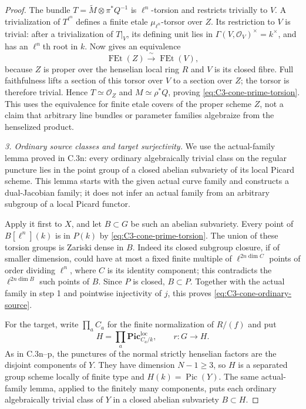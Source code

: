 \begin{proof}
The bundle
$T=\widetilde M\otimes\pi^*Q^{-1}$ is
$\ell^n$-torsion and restricts trivially to
$V$. A trivialization of $T^{\ell^n}$ defines
a finite etale $\mu_{\ell^n}$-torsor over $Z$.
Its restriction to $V$ is trivial: after a
trivialization of $T|_V$, its defining unit
lies in $\Gamma(V,\mathcal O_V)^\times=k^\times$,
and has an $\ell^n$th root in $k$.
Now
\citet[Lemma 58.9.1, Tag 0A48]{D_StacksProperEtale}
gives an equivalence
\[
                  \operatorname{FEt}(Z)
                       \xrightarrow{\ \sim\ }
                  \operatorname{FEt}(V),
\]
because $Z$ is proper over the henselian
local ring $R$ and $V$ is its closed fibre.
Full faithfulness lifts a section of this
torsor over $V$ to a section over $Z$;
the torsor is therefore trivial. Hence
$T\simeq\mathcal O_Z$ and
$M\simeq\rho^*Q$, proving
\eqref{eq:C3-cone-prime-torsion}.
This uses the equivalence for finite etale
covers of the proper scheme $Z$, not a
claim that arbitrary line bundles or
parameter families algebraize from the
henselized product.

\emph{3. Ordinary source classes and target
surjectivity.}
We use the actual-family lemma proved in
C.3n: every ordinary algebraically trivial
class on the regular puncture lies in the
point group of a closed abelian subvariety
of its local Picard scheme. This lemma
starts with the given actual curve family
and constructs a dual-Jacobian family;
it does not infer an actual family from
an arbitrary subgroup of a local Picard
functor.

Apply it first to $X$, and let $B\subset G$
be such an abelian subvariety. Every point
of $B[\ell^n](k)$ is in $P(k)$ by
\eqref{eq:C3-cone-prime-torsion}.
The union of these torsion groups is Zariski
dense in $B$. Indeed its closed subgroup
closure, if of smaller dimension, could
have at most a fixed finite multiple of
$\ell^{2n\dim C}$ points of order dividing
$\ell^n$, where $C$ is its identity
component; this contradicts the
$\ell^{2n\dim B}$ such points of $B$.
Since $P$ is closed, $B\subset P$.
Together with the actual family in step 1
and pointwise injectivity of $j$, this
proves \eqref{eq:C3-cone-ordinary-source}.

For the target, write $\prod_a C_a$ for
the finite normalization of $R/(f)$ and
put
\[
 H=\prod_a\mathbf{Pic}^{\mathrm{loc}}_{C_a/k},
                  \qquad r:G\longrightarrow H.
\]
As in C.3n--p, the punctures of the
normal strictly henselian factors are the
disjoint components of $Y$. They have
dimension $N-1\ge3$, so $H$ is a
separated group scheme locally of finite
type and $H(k)=\operatorname{Pic}(Y)$.
The same actual-family lemma, applied to
the finitely many components, puts each
ordinary algebraically trivial class of
$Y$ in a closed abelian subvariety
$B\subset H$.


\end{proof}
